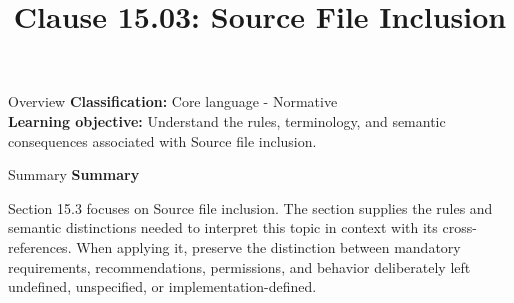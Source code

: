 \documentclass[10pt,letterpaper]{article}
\title{Clause 15.03: Source File Inclusion}
\author{}
\date{}
\begin{document}
\maketitle
\begin{CornellOverviewBox}{Overview}
\textbf{Classification:} Core language - Normative\\[2pt]
\textbf{Learning objective:} Understand the rules, terminology, and semantic consequences associated with Source file inclusion.
\end{CornellOverviewBox}\begin{CornellSummaryBox}{Summary}
{\sffamily\bfseries\color{Accent} Summary}\par\vspace{3pt}Section 15.3 focuses on Source file inclusion. The section supplies the rules and semantic distinctions needed to interpret this topic in context with its cross-references. When applying it, preserve the distinction between mandatory requirements, recommendations, permissions, and behavior deliberately left undefined, unspecified, or implementation-defined.
\end{CornellSummaryBox}
\end{document}
